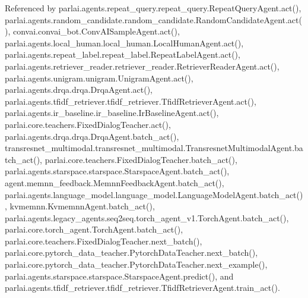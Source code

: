 Referenced by parlai.\+agents.\+repeat\+\_\+query.\+repeat\+\_\+query.\+Repeat\+Query\+Agent.\+act(), parlai.\+agents.\+random\+\_\+candidate.\+random\+\_\+candidate.\+Random\+Candidate\+Agent.\+act(), convai.\+convai\+\_\+bot.\+Conv\+A\+I\+Sample\+Agent.\+act(), parlai.\+agents.\+local\+\_\+human.\+local\+\_\+human.\+Local\+Human\+Agent.\+act(), parlai.\+agents.\+repeat\+\_\+label.\+repeat\+\_\+label.\+Repeat\+Label\+Agent.\+act(), parlai.\+agents.\+retriever\+\_\+reader.\+retriever\+\_\+reader.\+Retriever\+Reader\+Agent.\+act(), parlai.\+agents.\+unigram.\+unigram.\+Unigram\+Agent.\+act(), parlai.\+agents.\+drqa.\+drqa.\+Drqa\+Agent.\+act(), parlai.\+agents.\+tfidf\+\_\+retriever.\+tfidf\+\_\+retriever.\+Tfidf\+Retriever\+Agent.\+act(), parlai.\+agents.\+ir\+\_\+baseline.\+ir\+\_\+baseline.\+Ir\+Baseline\+Agent.\+act(), parlai.\+core.\+teachers.\+Fixed\+Dialog\+Teacher.\+act(), parlai.\+agents.\+drqa.\+drqa.\+Drqa\+Agent.\+batch\+\_\+act(), transresnet\+\_\+multimodal.\+transresnet\+\_\+multimodal.\+Transresnet\+Multimodal\+Agent.\+batch\+\_\+act(), parlai.\+core.\+teachers.\+Fixed\+Dialog\+Teacher.\+batch\+\_\+act(), parlai.\+agents.\+starspace.\+starspace.\+Starspace\+Agent.\+batch\+\_\+act(), agent.\+memnn\+\_\+feedback.\+Memnn\+Feedback\+Agent.\+batch\+\_\+act(), parlai.\+agents.\+language\+\_\+model.\+language\+\_\+model.\+Language\+Model\+Agent.\+batch\+\_\+act(), kvmemnn.\+Kvmemnn\+Agent.\+batch\+\_\+act(), parlai.\+agents.\+legacy\+\_\+agents.\+seq2seq.\+torch\+\_\+agent\+\_\+v1.\+Torch\+Agent.\+batch\+\_\+act(), parlai.\+core.\+torch\+\_\+agent.\+Torch\+Agent.\+batch\+\_\+act(), parlai.\+core.\+teachers.\+Fixed\+Dialog\+Teacher.\+next\+\_\+batch(), parlai.\+core.\+pytorch\+\_\+data\+\_\+teacher.\+Pytorch\+Data\+Teacher.\+next\+\_\+batch(), parlai.\+core.\+pytorch\+\_\+data\+\_\+teacher.\+Pytorch\+Data\+Teacher.\+next\+\_\+example(), parlai.\+agents.\+starspace.\+starspace.\+Starspace\+Agent.\+predict(), and parlai.\+agents.\+tfidf\+\_\+retriever.\+tfidf\+\_\+retriever.\+Tfidf\+Retriever\+Agent.\+train\+\_\+act().

